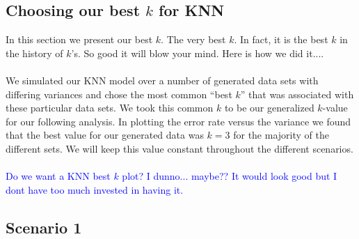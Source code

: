 \documentclass[11pt, oneside]{article}
\begin{document}
\subsection*{Choosing our best $k$ for KNN}
In this section we present our best $k$. The very best $k$. In fact, it is the best $k$ in the history of $k$'s. So good it will blow your mind. Here is how we did it....\\
\\
We simulated our KNN model over a number of generated data sets with differing variances and chose the most common ``best $k$'' that was associated with these particular data sets. We took this common $k$ to be our generalized $k$-value for our following analysis. In plotting the error rate versus the variance we found that the best value for our generated data was $k = 3$ for the majority of the different sets. We will keep this value constant throughout the different scenarios.\\
\\
\textcolor{blue}{Do we want a KNN best $k$ plot? I dunno... maybe?? It would look good but I dont have too much invested in having it.}

\pagebreak

\subsection*{Scenario 1}
\end{document}

